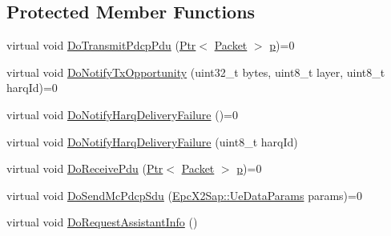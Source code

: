 \subsection*{Protected Member Functions}
\begin{DoxyCompactItemize}
\item 
virtual void \hyperlink{classns3_1_1LteRlc_af1e6ccdc5f9f2bee9d42a056e94351a5}{Do\+Transmit\+Pdcp\+Pdu} (\hyperlink{classns3_1_1Ptr}{Ptr}$<$ \hyperlink{classns3_1_1Packet}{Packet} $>$ \hyperlink{lte__link__budget__x2__handover__measures_8m_ac9de518908a968428863f829398a4e62}{p})=0
\item 
virtual void \hyperlink{classns3_1_1LteRlc_aee0c0620f4f1cd04fa08c78438cb3529}{Do\+Notify\+Tx\+Opportunity} (uint32\+\_\+t bytes, uint8\+\_\+t layer, uint8\+\_\+t harq\+Id)=0
\item 
virtual void \hyperlink{classns3_1_1LteRlc_ab0997ae77359f7a53ae33ebb3c1f6e02}{Do\+Notify\+Harq\+Delivery\+Failure} ()=0
\item 
virtual void \hyperlink{classns3_1_1LteRlc_aa5b663ccfd45ae47b923d52990baec8b}{Do\+Notify\+Harq\+Delivery\+Failure} (uint8\+\_\+t harq\+Id)
\item 
virtual void \hyperlink{classns3_1_1LteRlc_af2e315f4fe83d8d8f970832055a784d3}{Do\+Receive\+Pdu} (\hyperlink{classns3_1_1Ptr}{Ptr}$<$ \hyperlink{classns3_1_1Packet}{Packet} $>$ \hyperlink{lte__link__budget__x2__handover__measures_8m_ac9de518908a968428863f829398a4e62}{p})=0
\item 
virtual void \hyperlink{classns3_1_1LteRlc_a7a9eddaf5d069799f9950d696b30b034}{Do\+Send\+Mc\+Pdcp\+Sdu} (\hyperlink{structns3_1_1EpcX2Sap_1_1UeDataParams}{Epc\+X2\+Sap\+::\+Ue\+Data\+Params} params)=0
\item 
virtual void \hyperlink{classns3_1_1LteRlc_a899e4dc4b5dcd5637821fceefb0d7550}{Do\+Request\+Assistant\+Info} ()
\end{DoxyCompactItemize}
